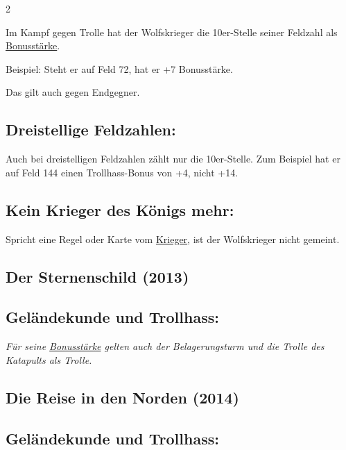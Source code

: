 \documentclass[10pt, a4paper, oneside]{book}
\newcommand{\fan}[1]{\textit{#1}}
\begin{document}
\begin{multicols*}{2}
\begin{nobgcolor}
Im Kampf gegen Trolle hat der Wolfskrieger die 10er-Stelle seiner Feldzahl als \hyperref[bonusstaerke]{Bonusstärke}.

Beispiel: Steht er auf Feld 72, hat er +7 Bonusstärke.

Das gilt auch gegen Endgegner.





\subsection{Dreistellige Feldzahlen:}

Auch bei dreistelligen Feldzahlen zählt nur die 10er-Stelle. Zum Beispiel hat er auf Feld 144 einen Trollhass-Bonus von +4, nicht +14.
\supercite{10525}




\subsection{Kein Krieger des Königs mehr:}

Spricht eine Regel oder Karte vom \hyperref[krieger]{Krieger}, ist der Wolfskrieger nicht gemeint.

\end{nobgcolor}


\begin{bgcolor}
\section{Der Sternenschild (2013)}

\subsection{Geländekunde und Trollhass:}

\fan{Für seine \hyperref[bonusstaerke]{Bonusstärke} gelten auch der Belagerungsturm und die Trolle des Katapults als Trolle.}

\end{bgcolor}




\begin{bgcolor}
\section{Die Reise in den Norden (2014)}

\subsection{Geländekunde und Trollhass:}


\end{bgcolor}
\end{multicols*}
\end{document}
